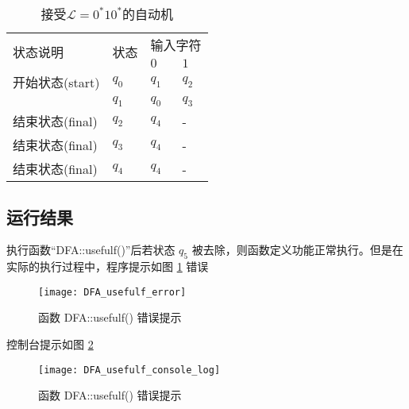 \begin{table}[!htbp]
    \caption{接受{$\mathcal{L}=0^*10^*$}的自动机{\cite{book1}}}
    \label{tab:DFA4_1}
    \centering
    \small%
    \setlength{\tabcolsep}{4pt}%
    \renewcommand{\arraystretch}{1.2}%
        \begin{tabular}{l p{4em}<{\centering} p{3em}<{\centering} p{3em}<{\centering}}
        \toprule %
        \multirow{2}{*}{状态说明} & \multirow{2}{*}{状态} & \multicolumn{2}{c}{输入字符} \\
		\cline{3-4}      &    &$0$ & $1$  \\
        \midrule%
        开始状态(start)  & $q_0$ & $q_1$   & $q_2$   \\
                        & $q_1$ & $q_0$   & $q_3$   \\
        结束状态(final) & $q_2$ & $q_4$   & -   \\
        结束状态(final) & $q_3$ & $q_4$   & -   \\
        结束状态(final) & $q_4$ & $q_4$   & -   \\
        \bottomrule%
    \end{tabular}
\end{table}

\subsection{运行结果}

执行函数“DFA::usefulf()”后若状态 $q_5$ 被去除，则函数定义功能正常执行。但是在实际的执行过程中，程序提示如图 \ref{fig::usefulf_error} 错误 

\begin{figure}[!htbp]
    \centering
    \texttt{[image: DFA\_usefulf\_error]}
    \caption{函数 DFA::usefulf() 错误提示}
    \label{fig::usefulf_error}
\end{figure}
控制台提示如图 \ref{fig::usefulf_console_log}
\begin{figure}[!htbp]
    \centering
    \texttt{[image: DFA\_usefulf\_console\_log]}
    \caption{函数 DFA::usefulf() 错误提示}
    \label{fig::usefulf_console_log}
\end{figure}

